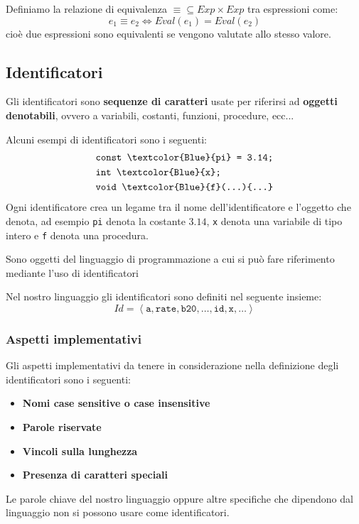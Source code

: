 \documentclass[a4paper]{article}
\begin{document}
\begin{definition}
  Definiamo la relazione di equivalenza \( \equiv \subseteq Exp \times Exp \) tra
  espressioni come:
  \[
    e_1 \equiv e_2 \iff Eval(e_1) = Eval(e_2)
  \] 
  cioè due espressioni sono equivalenti se vengono valutate allo stesso valore.
\end{definition}

\subsection{Identificatori}
Gli identificatori sono \textbf{sequenze di caratteri} usate per riferirsi ad
\textbf{oggetti denotabili}, ovvero a variabili, costanti, funzioni, procedure, ecc...

\begin{example}
  Alcuni esempi di identificatori sono i seguenti:
  \[
  \begin{aligned}
    &\texttt{const \textcolor{Blue}{pi} = 3.14;} \\
    &\texttt{int \textcolor{Blue}{x};} \\
    &\texttt{void \textcolor{Blue}{f}(...)\{...\}}
  \end{aligned}
  \] 
  Ogni identificatore crea un legame tra il nome dell'identificatore e l'oggetto
  che denota, ad esempio \texttt{pi} denota la costante \( 3.14 \), \texttt{x} denota
  una variabile di tipo intero e \texttt{f} denota una procedura.
\end{example}

\begin{definition}
  Sono oggetti del linguaggio di programmazione a cui si può fare riferimento mediante
  l'uso di identificatori
\end{definition}

\noindent
 Nel nostro linguaggio gli 
identificatori sono definiti nel seguente insieme:
\[
  Id = \left< \texttt{a}, \texttt{rate}, \texttt{b20}, \ldots, \texttt{id}, \texttt{x}, \ldots \right>
\] 

\subsubsection{Aspetti implementativi}
Gli aspetti implementativi da tenere in considerazione nella definizione degli
identificatori sono i seguenti:
\begin{itemize}
  \item \textbf{Nomi case sensitive o case insensitive}
  \item \textbf{Parole riservate}
  \item \textbf{Vincoli sulla lunghezza}
  \item \textbf{Presenza di caratteri speciali}
\end{itemize}
Le parole chiave del nostro linguaggio oppure altre specifiche che dipendono dal
linguaggio non si possono usare come identificatori.
\end{document}
